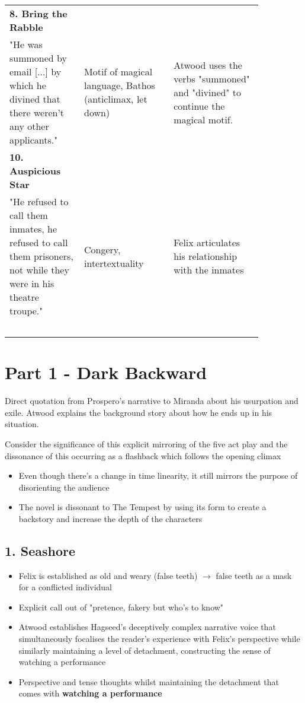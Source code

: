\begin{table}[htbp]
\begin{tabular}{ p{0.25\linewidth} | p{0.3\linewidth} | p{0.3\linewidth}}
				\textbf{8. Bring the Rabble} &	&	\\
				"He was summoned by email [...] by which he divined that there weren't any other applicants." & Motif of magical language, Bathos (anticlimax, let down) & Atwood uses the verbs "summoned" and "divined" to continue the magical motif. \\
				\textbf{10. Auspicious Star} & & \\
				"He refused to call them inmates, he refused to call them prisoners, not while they were in his theatre troupe." & Congery, intertextuality & Felix articulates his relationship with the inmates \\
				\
			\end{tabular}
		\end{table}

\section{Part 1 - Dark Backward}

	Direct quotation from Prospero's narrative to Miranda about his usurpation and exile. Atwood explains the background story about how he ends up in his situation.

	Consider the significance of this explicit mirroring of the five act play and the dissonance of this occurring as a flashback which follows the opening climax

	\begin{itemize}
		\item Even though there's a change in time linearity, it still mirrors the purpose of disorienting the audience
		\item The novel is dissonant to The Tempest by using its form to create a backstory and increase the depth of the characters
	\end{itemize}

	\subsection{1. Seashore}
	
		\begin{itemize}
			\item Felix is established as old and weary (false teeth) $\rightarrow$ false teeth as a mask for a conflicted individual
			\item Explicit call out of "pretence, fakery but who's to know"
			\item Atwood establishes Hagseed's deceptively complex narrative voice that simultaneously focalises the reader's experience with Felix's perspective while similarly maintaining a level of detachment, constructing the sense of watching a performance
			\item Perspective and tense thoughts whilst maintaining the detachment that comes with \textbf{watching a performance}
		\end{itemize}

